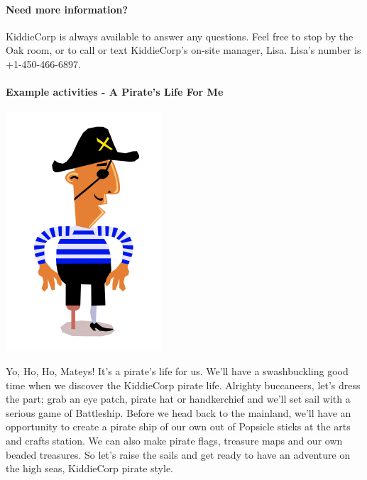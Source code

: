 \paragraph{Need more information?}
KiddieCorp is always available to answer any questions. Feel free to stop by the Oak room, or to call or text KiddieCorp's on-site manager, Lisa.  Lisa's number is +1-450-466-6897.

\paragraph{Example activities - A Pirate's Life For Me}

\includegraphics{content/local-guide/pirate_resized.pdf}

Yo, Ho, Ho, Mateys! It's a pirate's life for us. We'll have a swashbuckling good time when we discover the KiddieCorp pirate life. Alrighty buccaneers, let's dress the part; grab an eye patch, pirate hat or handkerchief and we'll set sail with a serious game of Battleship.
Before we head back to the mainland, we'll have an opportunity to create a pirate ship of our own out of Popsicle sticks at the arts and crafts station. We can also make pirate flags, treasure maps and our own beaded treasures. So let's raise the sails and get ready to have an adventure on the high seas, KiddieCorp pirate style.
